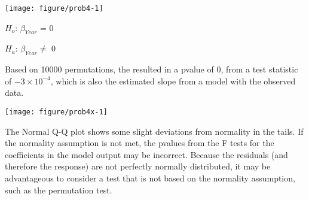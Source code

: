 \documentclass[11pt]{article}
\begin{document}
\begin{enumerate}
\begin{knitrout}
\begin{kframe}
{\ttfamily\noindent\bfseries{}}\begin{alltt}
  \hlstd{=} \hlstd{,}  \hlstd{=}   \hlstd{=} \hlstd{)}
\hlstd{(} \hlstd{=} \hlstd{(lm.Year)[}\hlstd{],}  \hlstd{=} \hlstd{)}
\end{alltt}
\end{kframe}
\texttt{[image: figure/prob4-1]} 
\begin{kframe}\begin{alltt}
 \hlkwb{<-} \hlstd{(}\hlstd{(}\hlopt{<=}\hlstd{(lm.Year)[}\hlstd{]))} \hlopt{+} \hlstd{(}\hlopt{>=-}\hlstd{(lm.Year)[}\hlstd{])))}\hlopt{/}
\end{alltt}
\end{kframe}
\end{knitrout}

$H_{o}$: $\beta_{Year}$ = 0

$H_{a}$: $\beta_{Year} \neq$ 0

Based on 10000 permutations, the resulted in a pvalue of 0, from a test statistic of \ensuremath{-3\times 10^{-4}}, which is also the estimated slope from a model with the observed data.

\begin{knitrout}
\color{fgcolor}\begin{kframe}
\begin{alltt}
\hlstd{(}\hlstd{=}\hlstd{(}\hlstd{,}\hlstd{))}
  \hlstd{=} \hlstd{)}
\end{alltt}
\end{kframe}
\texttt{[image: figure/prob4x-1]} 

\end{knitrout}
The Normal Q-Q plot shows some slight deviations from normality in the tails. If the normality assumption is not met, the pvalues from the F tests for the coefficients in the model output may be incorrect. Because the residuals (and therefore the response) are not perfectly normally distributed, it may be advantageous to consider a test that is not based on the normality assumption, such as the permutation test.


\end{enumerate}
\end{document}
